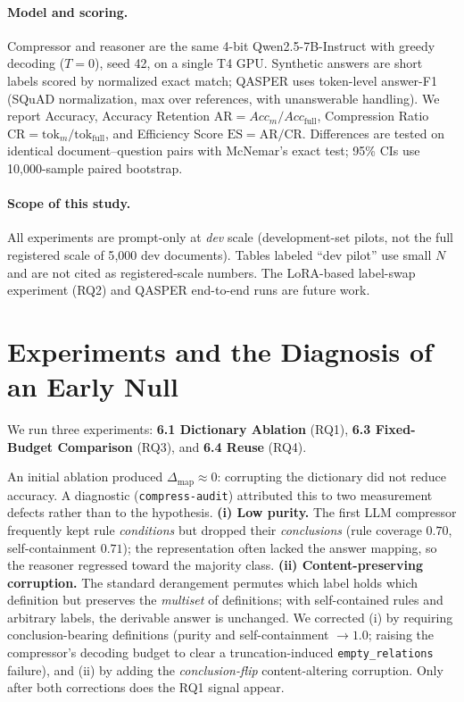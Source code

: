 \documentclass{article}
\begin{document}
\paragraph{Model and scoring.}
Compressor and reasoner are the same 4-bit Qwen2.5-7B-Instruct with greedy
decoding (\(T=0\)), seed 42, on a single T4 GPU. Synthetic answers are short
labels scored by normalized exact match; QASPER uses token-level answer-F1 (SQuAD
normalization, max over references, with unanswerable handling). We report
Accuracy, Accuracy Retention $\mathrm{AR}=Acc_m/Acc_{\mathrm{full}}$, Compression
Ratio $\mathrm{CR}=\mathrm{tok}_m/\mathrm{tok}_{\mathrm{full}}$, and Efficiency
Score $\mathrm{ES}=\mathrm{AR}/\mathrm{CR}$. Differences are tested on identical
document--question pairs with McNemar's exact test; 95\% CIs use 10{,}000-sample
paired bootstrap.

\paragraph{Scope of this study.}
All experiments are prompt-only at \emph{dev} scale (development-set pilots, not
the full registered scale of 5{,}000 dev documents). Tables labeled ``dev pilot''
use small $N$ and are not cited as registered-scale numbers. The LoRA-based
label-swap experiment (RQ2) and QASPER end-to-end runs are future work.

\section{Experiments and the Diagnosis of an Early Null}
\label{sec:diagnosis}
We run three experiments: \textbf{6.1 Dictionary Ablation} (RQ1),
\textbf{6.3 Fixed-Budget Comparison} (RQ3), and \textbf{6.4 Reuse} (RQ4).

An initial ablation produced $\Delta_{\mathrm{map}}\approx 0$: corrupting the
dictionary did not reduce accuracy. A diagnostic (\texttt{compress-audit})
attributed this to two measurement defects rather than to the hypothesis.
\textbf{(i) Low purity.} The first LLM compressor frequently kept rule
\emph{conditions} but dropped their \emph{conclusions} (rule coverage $0.70$,
self-containment $0.71$); the representation often lacked the answer mapping, so
the reasoner regressed toward the majority class. \textbf{(ii) Content-preserving
corruption.} The standard derangement permutes which label holds which definition
but preserves the \emph{multiset} of definitions; with self-contained rules and
arbitrary labels, the derivable answer is unchanged. We corrected (i) by requiring
conclusion-bearing definitions (purity and self-containment $\to 1.0$; raising the
compressor's decoding budget to clear a truncation-induced
\texttt{empty\_relations} failure), and (ii) by adding the \emph{conclusion-flip}
content-altering corruption. Only after both corrections does the RQ1 signal
appear.
\end{document}
